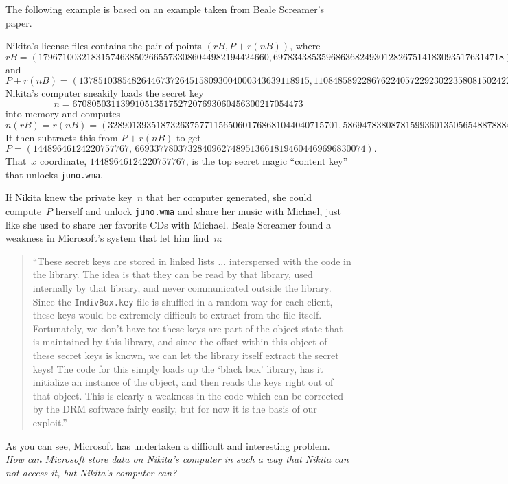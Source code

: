 \documentclass[11pt]{report}
\begin{document}
The following example is based on an example taken from Beale
Screamer's paper.
\begin{example}
  Nikita's license files contains the pair of points
  $(rB,P+r(nB))$, where
    {\tiny$$
        rB = (179671003218315746385026655733086044982194424660,
        697834385359686368249301282675141830935176314718)
      $$}
  and
    {\tiny$$
        P+r(nB) = (137851038548264467372645158093004000343639118915,
        110848589228676224057229230223580815024224875699).
      $$}
  Nikita's computer sneakily loads the secret key
  $$
    n = 670805031139910513517527207693060456300217054473
  $$ into memory
  and computes
    {\tiny$$n(rB) = r(nB) =
        (328901393518732637577115650601768681044040715701,
        586947838087815993601350565488788846203887988162).
      $$}
  It then subtracts this from $P+r(nB)$ to get
  $$
    P = (14489646124220757767, \,669337780373284096274895136618194604469696830074).
  $$
  That~$x$ coordinate, $14489646124220757767$, is the top secret magic ``content
  key'' that unlocks {\tt juno.wma}.
\end{example}

If Nikita knew the private key~$n$ that her computer generated, she
could compute~$P$ herself and unlock {\tt juno.wma} and share her
music with Michael, just like she used to share her favorite CDs with
Michael.  Beale Screamer found a weakness in Microsoft's system that
let him find~$n$:
\begin{quote}
  ``These secret keys are stored in linked lists ... interspersed with the
  code in the library.  The idea is that they can be read by that
  library, used internally by that library, and never communicated
  outside the library.  Since the {\tt IndivBox.key} file is shuffled in
  a random way for each client, these keys would be extremely difficult
  to extract from the file itself. Fortunately, we don't have to: these
  keys are part of the object state that is maintained by this library,
  and since the offset within this object of these secret keys is known,
  we can let the library itself extract the secret keys!  The code for
  this simply loads up the `black box' library, has it initialize an
  instance of the object, and then reads the keys right out of that
  object.  This is clearly a weakness in the code which can be corrected
  by the DRM software fairly easily, but for now it is the basis of our
  exploit.''
\end{quote}

As you can see, Microsoft has undertaken a difficult and interesting
problem.  {\em How can Microsoft  store data on Nikita's
    computer in such a way that Nikita can not access it, but Nikita's
    computer can?}
\end{document}
